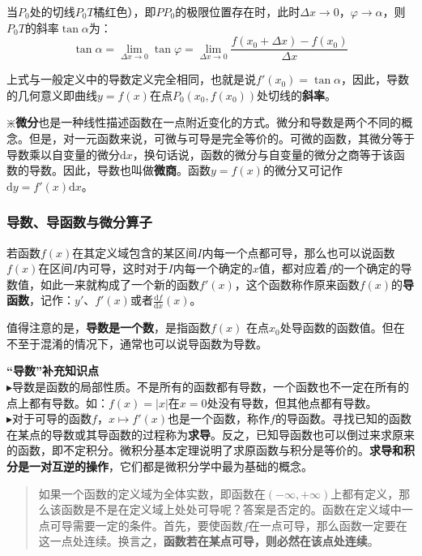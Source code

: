 \documentclass[UTF8]{ctexart}
\begin{document}
{当$P_0$处的切线$P_0 T$橘红色），即$P P_0$的极限位置存在时，此时$\Delta x \to 0$，$\varphi \to \alpha$，则$P_0 T$的斜率$\tan \alpha$为：
\begin{equation}
	\tan \alpha =\lim _{\Delta x\to 0} \tan \varphi =\lim _{\Delta x\to 0}\frac {f(x_{0}+\Delta x)-f(x_{0})}{\Delta x}
\end{equation}

上式与一般定义中的导数定义完全相同，也就是说$f'(x_0)=\tan \alpha$，因此，导数的几何意义即曲线$y=f(x)$在点$P_0(x_0,f(x_0))$处切线的\textbf{斜率}。

\begin{question}
	$\divideontimes$\textbf{微分}也是一种线性描述函数在一点附近变化的方式。微分和导数是两个不同的概念。但是，对一元函数来说，可微与可导是完全等价的。可微的函数，其微分等于导数乘以自变量的微分$\mathrm{d}x$，换句话说，函数的微分与自变量的微分之商等于该函数的导数。因此，导数也叫做\textbf{微商}。函数$y = f(x)$的微分又可记作$\mathrm{d}y = f'(x)\mathrm{d}x$。
\end{question}
\subsubsection{导数、导函数与微分算子}
若函数$f(x)$在其定义域包含的某区间$I$内每一个点都可导，那么也可以说函数$f(x)$在区间$I$内可导，这时对于$I$内每一个确定的$x$值，都对应着$f$的一个确定的导数值，如此一来就构成了一个新的函数$f'(x)$，这个函数称作原来函数$f(x)$的\textbf{导函数}，记作：$y'$、$f'(x)$或者$\tfrac  {\mathrm {d}f}{\mathrm  {d}x}(x)$。

值得注意的是，\textbf{导数是一个数}，是指函数$f(x)$ 在点$x_0$处导函数的函数值。但在不至于混淆的情况下，通常也可以说导函数为导数。
\begin{info}[Notice:]\textbf{“导数”补充知识点}\\
	$\blacktriangleright$导数是函数的局部性质。不是所有的函数都有导数，一个函数也不一定在所有的点上都有导数。如：$f(x)=|x|$在$x=0$处没有导数，但其他点都有导数。\\
    $\blacktriangleright$对于可导的函数$f$，$x \mapsto f'(x)$也是一个函数，称作$f$的导函数。寻找已知的函数在某点的导数或其导函数的过程称为\textbf{求导}。反之，已知导函数也可以倒过来求原来的函数，即不定积分。微积分基本定理说明了求原函数与积分是等价的。\textbf{求导和积分是一对互逆的操作}，它们都是微积分学中最为基础的概念。
\end{info}
\begin{quote}
	如果一个函数的定义域为全体实数，即函数在$(-\infty,+\infty)$上都有定义，那么该函数是不是在定义域上处处可导呢？答案是否定的。函数在定义域中一点可导需要一定的条件。首先，要使函数$f$在一点可导，那么函数一定要在这一点处连续。换言之，\textbf{函数若在某点可导，则必然在该点处连续}。
\end{quote}

}
\end{document}

